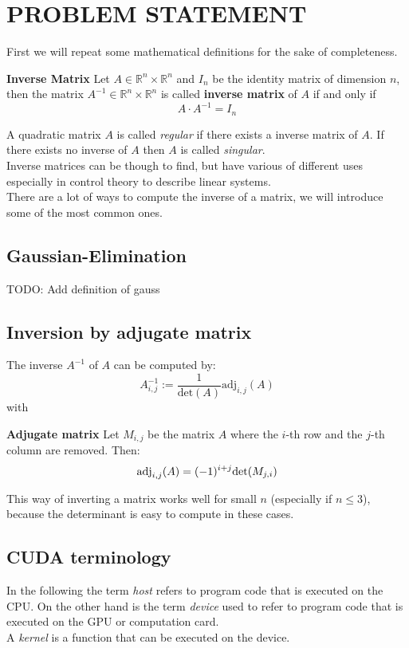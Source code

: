 

\section{PROBLEM STATEMENT}\label{sec:problem}
First we will repeat some mathematical definitions for the sake of completeness.
\begin{definition}
	\textbf{Inverse Matrix}
	Let $A \in \mathbb{R}^n \times \mathbb{R}^n$ and $I_n$ be the identity matrix of dimension $n$, then the matrix $A^{-1} \in \mathbb{R}^n \times \mathbb{R}^n$ is called \textbf{inverse matrix} of $A$ if and only if
	\begin{equation}\label{eq:inverse}
	A \cdot A^{-1} = I_n
	\end{equation}
\end{definition}
A quadratic matrix $A$ is called \emph{regular} if there exists a inverse matrix of $A$. If there exists no inverse of $A$ then $A$ is called \emph{singular}.\\
Inverse matrices can be though to find, but have various of different uses especially in control theory to describe linear systems.  
\vspace{0.2cm}\\
There are a lot of ways to compute the inverse of a matrix, we will introduce some of the most common ones.\\
\subsection*{Gaussian-Elimination}
TODO: Add definition of gauss
\vspace{0.2cm}\\
\subsection*{Inversion by adjugate matrix}
The inverse $A^{-1}$ of $A$ can be computed by:
\begin{equation}
	A^{-1}_{i,j} := \frac{1}{\text{det}(A)} \text{adj}_{i,j}(A)
\end{equation}
with
\begin{definition}
	\textbf{Adjugate matrix} Let $M_{i,j}$ be the matrix $A$ where the $i$-th row and the $j$-th column are removed. Then:
	\[ \text{\textnormal{adj}}_{i,j}(A) = (-1)^{i+j} \text{\textnormal{det}}(M_{j,i}) \]
\end{definition}
This way of inverting a matrix works well for small $n$ (especially if $n \leq 3$), because the determinant is easy to compute in these cases.\\

\subsection*{CUDA terminology}
In the following the term \emph{host} refers to program code that is executed on the CPU. On the other hand is the term \emph{device} used to refer to program code that is executed on the GPU or computation card.\\
A \emph{kernel} is a function that can be executed on the device.

